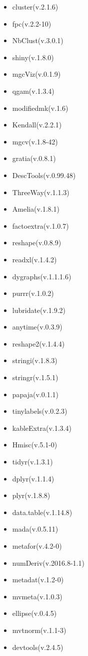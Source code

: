 \documentclass[
]{article}
\providecommand{\tightlist}{%
  \setlength{\itemsep}{0pt}\setlength{\parskip}{0pt}}
\begin{document}
\begin{itemize}
\tightlist
\item
  cluster(v.2.1.6)
\item
  fpc(v.2.2-10)
\item
  NbClust(v.3.0.1)
\item
  shiny(v.1.8.0)
\item
  mgcViz(v.0.1.9)
\item
  qgam(v.1.3.4)
\item
  modifiedmk(v.1.6)
\item
  Kendall(v.2.2.1)
\item
  mgcv(v.1.8-42)
\item
  gratia(v.0.8.1)
\item
  DescTools(v.0.99.48)
\item
  ThreeWay(v.1.1.3)
\item
  Amelia(v.1.8.1)
\item
  factoextra(v.1.0.7)
\item
  reshape(v.0.8.9)
\item
  readxl(v.1.4.2)
\item
  dygraphs(v.1.1.1.6)
\item
  purrr(v.1.0.2)
\item
  lubridate(v.1.9.2)
\item
  anytime(v.0.3.9)
\item
  reshape2(v.1.4.4)
\item
  stringi(v.1.8.3)
\item
  stringr(v.1.5.1)
\item
  papaja(v.0.1.1)
\item
  tinylabels(v.0.2.3)
\item
  kableExtra(v.1.3.4)
\item
  Hmisc(v.5.1-0)
\item
  tidyr(v.1.3.1)
\item
  dplyr(v.1.1.4)
\item
  plyr(v.1.8.8)
\item
  data.table(v.1.14.8)
\item
  mada(v.0.5.11)
\item
  metafor(v.4.2-0)
\item
  numDeriv(v.2016.8-1.1)
\item
  metadat(v.1.2-0)
\item
  mvmeta(v.1.0.3)
\item
  ellipse(v.0.4.5)
\item
  mvtnorm(v.1.1-3)
\item
  devtools(v.2.4.5)

\end{itemize}
\end{document}
